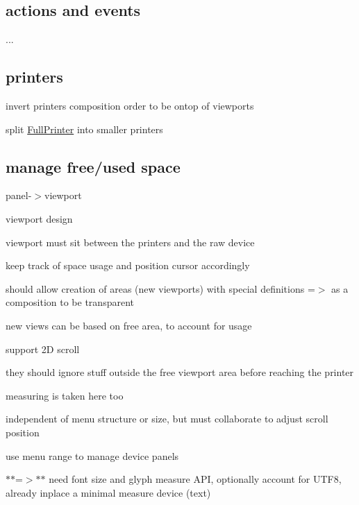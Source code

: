 \subsection*{actions and events}


\begin{DoxyItemize}
\item ...
\end{DoxyItemize}

\subsection*{printers}


\begin{DoxyItemize}
\item invert printers composition order to be ontop of viewports
\item split \hyperlink{structFullPrinter}{Full\+Printer} into smaller printers
\end{DoxyItemize}

\subsection*{manage free/used space}


\begin{DoxyItemize}
\item panel-\/$>$viewport
\end{DoxyItemize}

viewport design


\begin{DoxyItemize}
\item viewport must sit between the printers and the raw device
\item keep track of space usage and position cursor accordingly
\item should allow creation of areas (new viewports) with special definitions =$>$ as a composition to be transparent
\item new views can be based on free area, to account for usage
\item support 2D scroll
\item they should ignore stuff outside the free viewport area before reaching the printer
\item measuring is taken here too
\item independent of menu structure or size, but must collaborate to adjust scroll position
\item use menu range to manage device panels
\item $\ast$$\ast$=$>$$\ast$$\ast$ need font size and glyph measure A\+PI, optionally account for U\+T\+F8, already inplace a minimal measure device (text)
\end{DoxyItemize}

